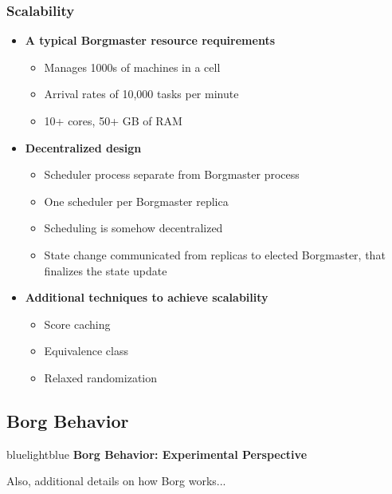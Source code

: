 \begin{frame}
\frametitle{Scalability}
\begin{itemize}
	\item {\bf A typical Borgmaster resource requirements}
	\begin{itemize}
		\item Manages 1000s of machines in a cell
		\item Arrival rates of 10,000 tasks per minute
		\item 10+ cores, 50+ GB of RAM
	\end{itemize}

\vspace{20pt}

	\item {\bf Decentralized design}
	\begin{itemize}
		\item Scheduler process separate from Borgmaster process
		\item One scheduler per Borgmaster replica
		\item Scheduling is somehow decentralized
		\item State change communicated from replicas to elected Borgmaster, that finalizes the state update
	\end{itemize}

\vspace{20pt}

	\item {\bf Additional techniques to achieve scalability}
	\begin{itemize}
		\item Score caching
		\item Equivalence class
		\item Relaxed randomization
	\end{itemize}
\end{itemize}
\end{frame}

\subsection{Borg Behavior}
\begin{frame}
 \begin{colorblock}{blue}{lightblue}{ }
    {\Large \textbf{Borg Behavior: Experimental Perspective}}

    Also, additional details on how Borg works...
  \end{colorblock}
\end{frame}

